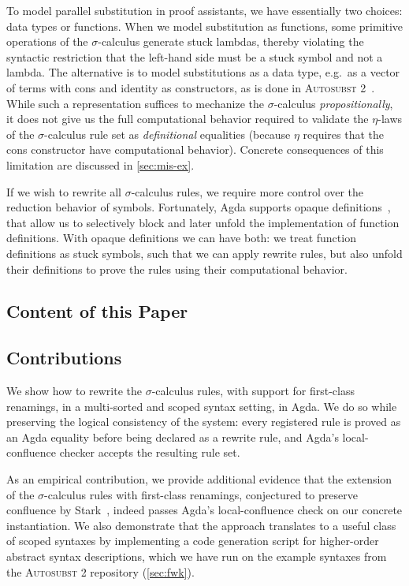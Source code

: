 \documentclass[a4paper,UKenglish,cleveref, autoref, thm-restate,anonymous]{lipics-v2021}
\begin{document}
To model parallel substitution in proof assistants, we have essentially two
choices: data types or functions. When we model substitution as functions, some
primitive operations of the $σ$-calculus generate stuck lambdas, thereby
violating the syntactic restriction that the left-hand side must be a stuck
symbol and not a lambda. The alternative is to model substitutions as a data
type, e.g.\ as a vector of terms with cons and identity as constructors, as is
done in \textsc{Autosubst 2}~\cite{10.1145/3293880.3294101}. While such a
representation suffices to mechanize the $σ$-calculus
\emph{propositionally}, it does not give us the full computational behavior
required to validate the $η$-laws of the $σ$-calculus rule set as
\emph{definitional} equalities (because $η$ requires that the cons constructor
have computational behavior). Concrete consequences of this limitation are
discussed in \cref{sec:mis-ex}.

If we wish to rewrite all $σ$-calculus rules, we require more control over the
reduction behavior of symbols. Fortunately, Agda supports opaque
definitions~\cite{gratzer2022controlling}, that allow us to selectively block
and later unfold the implementation of function definitions. With opaque
definitions we can have both: we treat function definitions as stuck symbols,
such that we can apply rewrite rules, but also unfold their definitions to
prove the rules using their computational behavior.

\subsection{Content of this Paper}

\subsection*{Contributions}
We show how to rewrite the $σ$-calculus rules, with support for first-class
renamings, in a multi-sorted and scoped syntax setting, in Agda. We do so while
preserving the logical consistency of the system: every registered rule is
proved as an Agda equality before being declared as a rewrite rule, and
Agda's local-confluence checker accepts the resulting rule set.

As an empirical contribution, we provide additional evidence that the
extension of the $σ$-calculus rules with first-class
renamings, conjectured to preserve confluence by Stark~\cite{Stark:2020:Mechanising},
indeed passes Agda's local-confluence check on our concrete instantiation. We
also demonstrate that the approach translates to a useful class of scoped
syntaxes by implementing a code generation script for higher-order abstract
syntax descriptions, which we have run on the example syntaxes from the
\textsc{Autosubst 2} repository (\cref{sec:fwk}).
\end{document}
